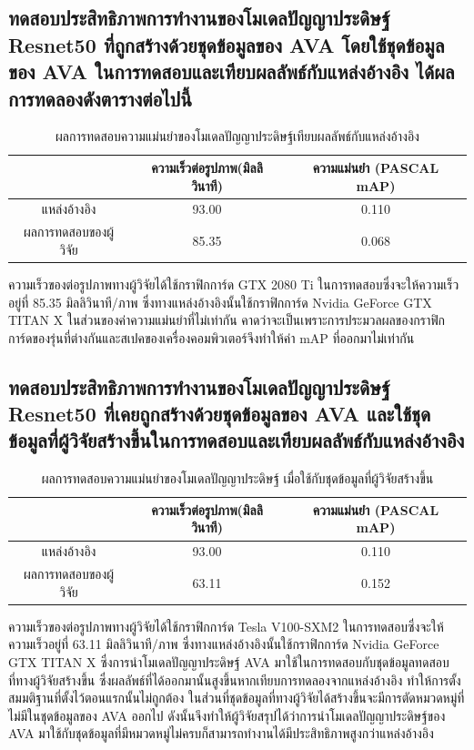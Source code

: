 \subsection{ทดสอบประสิทธิภาพการทำงานของโมเดลปัญญาประดิษฐ์ Resnet50 ที่ถูกสร้างด้วยชุดข้อมูลของ AVA โดยใช้ชุดข้อมูลของ AVA ในการทดสอบและเทียบผลลัพธ์กับแหล่งอ้างอิง ได้ผลการทดลองดังตารางต่อไปนี้}
\begin{table}[!ht]
	\centering
	\begin{tabular}{|c|c|c|}
			\hline
			{}&{ความเร็วต่อรูปภาพ(มิลลิวินาที)}&{ความแม่นยำ (PASCAL mAP)}			\\
			\hline
			แหล่งอ้างอิง	 					& 93.00		& 0.110				\\
			ผลการทดสอบของผู้วิจัย				& 85.35  	& 0.068				\\
			\hline
	\end{tabular}
\caption{ผลการทดสอบความแม่นยำของโมเดลปัญญาประดิษฐ์เทียบผลลัพธ์กับแหล่งอ้างอิง}
\label{tab: Compare PASCAL mAP with source}
\end{table}
ความเร็วของต่อรูปภาพทางผู้วิจัยได้ใช้กราฟิกการ์ด GTX 2080 Ti ในการทดสอบซึ่งจะให้ความเร็วอยู่ที่ 85.35 มิลลิวินาที/ภาพ ซึ่งทางแหล่งอ้างอิงนั้นใช้กราฟิกการ์ด Nvidia GeForce GTX TITAN X 
ในส่วนของค่าความแม่นยำที่ไม่เท่ากัน คาดว่าจะเป็นเพราะการประมวลผลของกราฟิกการ์ดของรุ่นที่ต่างกันและสเปคของเครื่องคอมพิวเตอร์จึงทำให้ค่า mAP ที่ออกมาไม่เท่ากัน

\subsection{ทดสอบประสิทธิภาพการทำงานของโมเดลปัญญาประดิษฐ์ Resnet50 ที่เคยถูกสร้างด้วยชุดข้อมูลของ AVA และใช้ชุดข้อมูลที่ผู้วิจัยสร้างขึ้นในการทดสอบและเทียบผลลัพธ์กับแหล่งอ้างอิง}
\begin{table}[!ht]
	\centering
	\begin{tabular}{|c|c|c|}
			\hline
			{}&{ความเร็วต่อรูปภาพ(มิลลิวินาที)}&{ความแม่นยำ (PASCAL mAP)}			\\
			\hline
			แหล่งอ้างอิง	 					& 93.00			& 0.110			\\
			ผลการทดสอบของผู้วิจัย				& 63.11			& 0.152			\\
			\hline
	\end{tabular}
\caption{ผลการทดสอบความแม่นยำของโมเดลปัญญาประดิษฐ์ เมื่อใช้กับชุดข้อมูลที่ผู้วิจัยสร้างขึ้น}
\label{tab: Compare PASCAL mAP with dataset created by the researcher}
\end{table}
ความเร็วของต่อรูปภาพทางผู้วิจัยได้ใช้กราฟิกการ์ด Tesla V100-SXM2 ในการทดสอบซึ่งจะให้ความเร็วอยู่ที่ 63.11 มิลลิวินาที/ภาพ ซึ่งทางแหล่งอ้างอิงนั้นใช้กราฟิกการ์ด Nvidia GeForce GTX TITAN X ซึ่งการนำโมเดลปัญญาประดิษฐ์ AVA มาใช้ในการทดสอบกับชุดข้อมูลทดสอบที่ทางผู้วิจัยสร้างขึ้น ซึ่งผลลัพธ์ที่ได้ออกมานั้นสูงขึ้นหากเทียบการทดลองจากแหล่งอ้างอิง ทำให้การตั้งสมมติฐานที่ตั้งไว้ตอนแรกนั้นไม่ถูกต้อง ในส่วนที่ชุดข้อมูลที่ทางผู้วิจัยได้สร้างขึ้นจะมีการตัดหมวดหมู่ที่ไม่มีในชุดข้อมูลของ AVA ออกไป ดังนั้นจึงทำให้ผู้วิจัยสรุปได้ว่าการนำโมเดลปัญญาประดิษฐ์ของ AVA มาใช้กับชุดข้อมูลที่มีหมวดหมู่ไม่ครบก็สามารถทำงานได้มีประสิทธิภาพสูงกว่าแหล่งอ้างอิง
\clearpage

